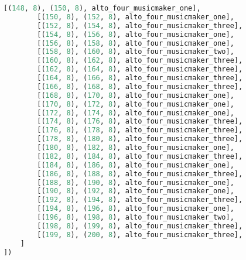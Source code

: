 \begin{lstlisting}[language=Python, caption=Invocation Source Code]
        [(148, 8), (150, 8), alto_four_musicmaker_one],
        [(150, 8), (152, 8), alto_four_musicmaker_one],
        [(152, 8), (154, 8), alto_four_musicmaker_three],
        [(154, 8), (156, 8), alto_four_musicmaker_one],
        [(156, 8), (158, 8), alto_four_musicmaker_one],
        [(158, 8), (160, 8), alto_four_musicmaker_two],
        [(160, 8), (162, 8), alto_four_musicmaker_three],
        [(162, 8), (164, 8), alto_four_musicmaker_three],
        [(164, 8), (166, 8), alto_four_musicmaker_three],
        [(166, 8), (168, 8), alto_four_musicmaker_three],
        [(168, 8), (170, 8), alto_four_musicmaker_one],
        [(170, 8), (172, 8), alto_four_musicmaker_one],
        [(172, 8), (174, 8), alto_four_musicmaker_one],
        [(174, 8), (176, 8), alto_four_musicmaker_three],
        [(176, 8), (178, 8), alto_four_musicmaker_three],
        [(178, 8), (180, 8), alto_four_musicmaker_three],
        [(180, 8), (182, 8), alto_four_musicmaker_one],
        [(182, 8), (184, 8), alto_four_musicmaker_three],
        [(184, 8), (186, 8), alto_four_musicmaker_one],
        [(186, 8), (188, 8), alto_four_musicmaker_three],
        [(188, 8), (190, 8), alto_four_musicmaker_one],
        [(190, 8), (192, 8), alto_four_musicmaker_one],
        [(192, 8), (194, 8), alto_four_musicmaker_three],
        [(194, 8), (196, 8), alto_four_musicmaker_one],
        [(196, 8), (198, 8), alto_four_musicmaker_two],
        [(198, 8), (199, 8), alto_four_musicmaker_three],
        [(199, 8), (200, 8), alto_four_musicmaker_three],
    ]
])


\end{lstlisting}
